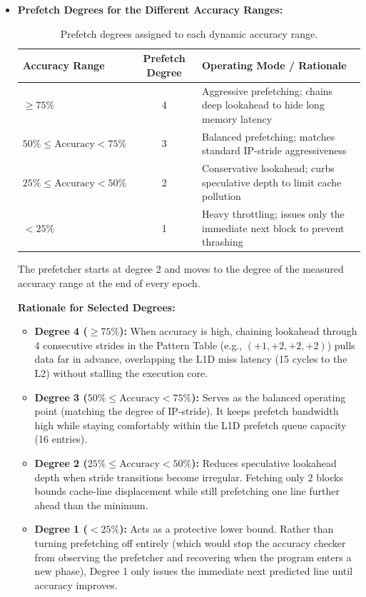\documentclass[a4paper, 11pt]{article}
\begin{document}
\begin{itemize}
    \item \textbf{Prefetch Degrees for the Different Accuracy Ranges:}

 \begin{table}[H]
\centering
\small
\caption{Prefetch degrees assigned to each dynamic accuracy range.}
\label{tab:spp-degree-throttling}
\begin{tabularx}{\textwidth}{@{}l c >{\raggedright\arraybackslash}X@{}}
\toprule
Accuracy Range & Prefetch Degree & Operating Mode / Rationale \\
\midrule
$\geq 75\%$ & 4 &
Aggressive prefetching; chains deep lookahead to hide long memory latency \\

$50\% \leq \text{Accuracy} < 75\%$ & 3 &
Balanced prefetching; matches standard IP-stride aggressiveness \\

$25\% \leq \text{Accuracy} < 50\%$ & 2 &
Conservative lookahead; curbs speculative depth to limit cache pollution \\

$< 25\%$ & 1 &
Heavy throttling; issues only the immediate next block to prevent thrashing \\
\bottomrule
\end{tabularx}
\end{table}

    The prefetcher starts at degree 2 and moves to the degree of the measured accuracy range at the end of every epoch.

    \textbf{Rationale for Selected Degrees:}
    \begin{itemize}
        \item \textbf{Degree 4 ($\ge 75\%$):} When accuracy is high, chaining lookahead through 4 consecutive strides in the Pattern Table (e.g., $(+1, +2, +2, +2)$) pulls data far in advance, overlapping the L1D miss latency (15 cycles to the L2) without stalling the execution core.
        \item \textbf{Degree 3 ($50\% \le \text{Accuracy} < 75\%$):} Serves as the balanced operating point (matching the degree of IP-stride). It keeps prefetch bandwidth high while staying comfortably within the L1D prefetch queue capacity (16 entries).
        \item \textbf{Degree 2 ($25\% \le \text{Accuracy} < 50\%$):} Reduces speculative lookahead depth when stride transitions become irregular. Fetching only 2 blocks bounds cache-line displacement while still prefetching one line further ahead than the minimum.
        \item \textbf{Degree 1 ($< 25\%$):} Acts as a protective lower bound. Rather than turning prefetching off entirely (which would stop the accuracy checker from observing the prefetcher and recovering when the program enters a new phase), Degree 1 only issues the immediate next predicted line until accuracy improves.
    \end{itemize}

\end{itemize}
\end{document}
